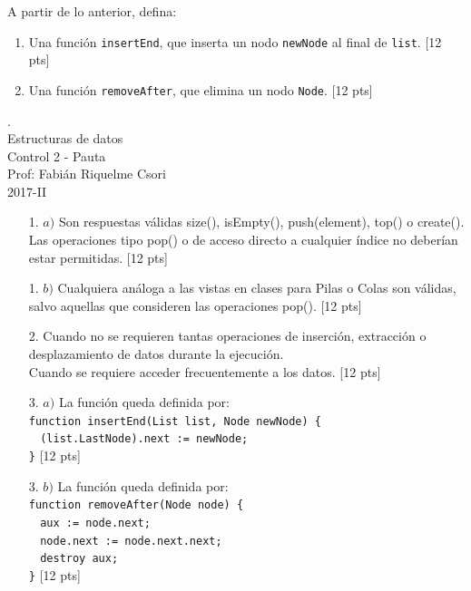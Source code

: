 \documentclass[letter,12pt,oneside]{book}
\theoremstyle{definition}
\begin{document}
\begin{enumerate}
    A partir de lo anterior, defina:
    \begin{enumerate}
        \item Una función \texttt{insertEnd}, que inserta un nodo \texttt{newNode} al final de \texttt{list}. \tabto{76ex} [12 pts]
        \item Una función \texttt{removeAfter}, que elimina un nodo \texttt{Node}. \tabto{76ex} [12 pts]
    \end{enumerate}
\end{enumerate}

\newpage

\begin{center}
 {\Large
  {\color{white}.}\\
  Estructuras de datos\\[1ex]
  Control 2 - Pauta}\\[1.2ex]
  Prof: Fabián Riquelme Csori\\
  2017-II
\end{center}

\begin{enumerate}
    \item[1. $a)$] Son respuestas válidas size(), isEmpty(), push(element), top() o create().\\
    Las operaciones tipo pop() o de acceso directo a cualquier índice no deberían estar permitidas. \tabto{81ex} [12 pts]
    \item[1. $b)$] Cualquiera análoga a las vistas en clases para Pilas o Colas son válidas, salvo aquellas que consideren las operaciones pop().\tabto{81ex} [12 pts]
    \item[2.] Cuando no se requieren tantas operaciones de inserción, extracción o desplazamiento de datos durante la ejecución.\\
    Cuando se requiere acceder frecuentemente a los datos. \tabto{81ex} [12 pts]
    \item[3. $a)$] La función queda definida por:\\[1.2ex]
    \texttt{function insertEnd(List list, Node newNode) \{}\\
    $~~~~$\texttt{(list.LastNode).next := newNode;}\\
    \texttt{\}} \tabto{81ex} [12 pts]
    \item[3. $b)$] La función queda definida por:\\[1.2ex]
    \texttt{function removeAfter(Node node) \{}\\
    $~~~~$\texttt{aux := node.next;}\\
    $~~~~$\texttt{node.next := node.next.next;}\\
    $~~~~$\texttt{destroy aux;}\\
    \texttt{\}} \tabto{81ex} [12 pts]
\end{enumerate}
\end{document}
